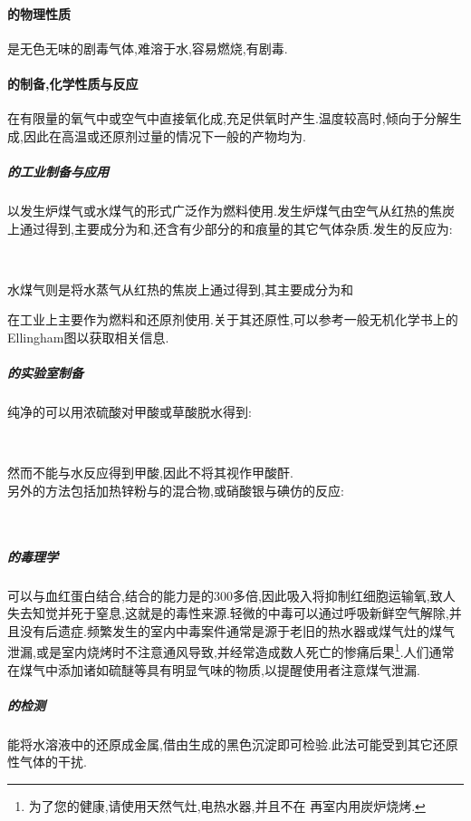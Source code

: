 \documentclass[draft]{ctexart}
\begin{document}
\paragraph{的物理性质}
是无色无味的剧毒气体,难溶于水,容易燃烧,有剧毒.
\paragraph{的制备,化学性质与反应}
在有限量的氧气中或空气中直接氧化成,充足供氧时产生.温度较高时,倾向于分解生成,因此在高温或还原剂过量的情况下一般的产物均为.
\subparagraph{的工业制备与应用}
以发生炉煤气或水煤气的形式广泛作为燃料使用.发生炉煤气由空气从红热的焦炭上通过得到,主要成分为和,还含有少部分的和痕量的其它气体杂质.发生的反应为:
\begin{center}
    \\
\end{center}
水煤气则是将水蒸气从红热的焦炭上通过得到,其主要成分为和
\begin{center}
\end{center}
在工业上主要作为燃料和还原剂使用.关于其还原性,可以参考一般无机化学书上的Ellingham图以获取相关信息.
\subparagraph{的实验室制备}
\indent 纯净的可以用浓硫酸对甲酸或草酸脱水得到:
\begin{center}
    \\
\end{center}
然而不能与水反应得到甲酸,因此不将其视作甲酸酐.\\
\indent 另外的方法包括加热锌粉与的混合物,或硝酸银与碘仿的反应:
\begin{center}
    \\
\end{center}
\subparagraph{的毒理学}
可以与血红蛋白结合,结合的能力是的$300$多倍,因此吸入将抑制红细胞运输氧,致人失去知觉并死于窒息,这就是的毒性来源.轻微的中毒可以通过呼吸新鲜空气解除,并且没有后遗症.频繁发生的室内中毒案件通常是源于老旧的热水器或煤气灶的煤气泄漏,或是室内烧烤时不注意通风导致,并经常造成数人死亡的惨痛后果\footnote{为了您的健康,请使用天然气灶,电热水器,并且不在
再室内用炭炉烧烤.}.人们通常在煤气中添加诸如硫醚等具有明显气味的物质,以提醒使用者注意煤气泄漏.
\subparagraph{的检测}
能将水溶液中的还原成金属,借由生成的黑色沉淀即可检验.此法可能受到其它还原性气体的干扰.
\end{document}
